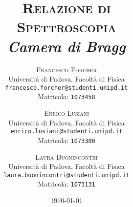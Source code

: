 \title{
\vspace{-3cm}
\fontsize{48pt}{10pt}\selectfont
\textsc{Relazione di \\[3mm] Spettroscopia} \\[8mm] 
\fontsize{24pt}{10pt}\selectfont
\textit{Camera di Bragg}
}
\author{
\large
\textsc{Francesco Forcher}\\[2mm]
\normalsize Università di Padova, Facoltà di Fisica\\
\normalsize \texttt{francesco.forcher@studenti.unipd.it}\\
\normalsize Matricola: \texttt{1073458}\\
\and
\large
\textsc{Enrico Lusiani}\\[2mm]
\normalsize Università di Padova, Facoltà di Fisica\\
\normalsize \texttt{enrico.lusiani@studenti.unipd.it}\\
\normalsize Matricola: \texttt{1073300}\\
\and
\large
\textsc{Laura Buonincontri}\\[2mm]
\normalsize Università di Padova, Facoltà di Fisica\\
\normalsize \texttt{laura.buonincontri@studenti.unipd.it}\\
\normalsize Matricola: \texttt{1073131}
}
\date{\today}
